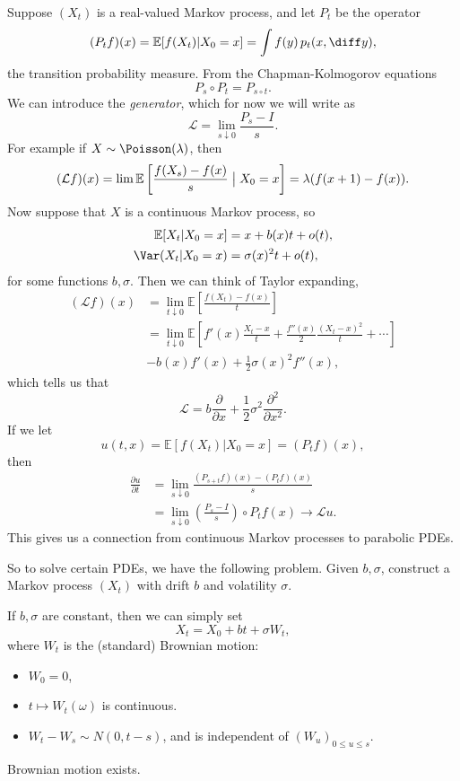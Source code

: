 \documentclass[12pt]{article}
\begin{document}
Suppose $(X_t)$ is a real-valued Markov process, and let $P_t$ be the operator
\[
	(P_t f)(x) = \mathbb{E}[f(X_t) | X_0 = x] = \int f(y) \, p_t(x, \diff y),
\]
the transition probability measure. From the Chapman-Kolmogorov equations
\[
P_s \circ P_t = P_{s \circ t}.
\]
We can introduce the \emph{generator}, which for now we will write as
\[
\mathcal{L} = \lim_{s \downarrow 0} \frac{P_s - I}{s}.
\]
For example if $X \sim \Poisson(\lambda)$, then
\[
	(\mathcal{L} f)(x) = \lim \mathbb{E}\left[ \frac{f(X_s) - f(x)}{s} \bigm| X_0 = x\right] = \lambda(f(x+1) - f(x)).
\]
Now suppose that $X$ is a continuous Markov process, so
\begin{align*}
	\mathbb{E}[X_t|X_0 = x] &= x + b(x) t + o(t), \\
	\Var(X_t|X_0 = x) &= \sigma(x)^2 t + o(t),
\end{align*}
for some functions $b, \sigma$. Then we can think of Taylor expanding,
\begin{align*}
	(\mathcal{L} f)(x) &= \lim_{t \downarrow 0} \mathbb{E}\left[ \frac{f(X_t) - f(x)}{t} \right] \\
			   &= \lim_{t \downarrow 0} \mathbb{E}\left[ f'(x) \frac{X_t - x}{t} + \frac{f''(x)}{2} \frac{(X_t - x)^2}{t} + \cdots \right] \\
			   &- b(x) f'(x) + \frac 12 \sigma(x)^2 f''(x),
\end{align*}
which tells us that
\[
\mathcal{L} = b \frac{\partial}{\partial x} + \frac 12 \sigma^2 \frac{\partial^2}{\partial x^2}.
\]
If we let
\[
u(t, x) = \mathbb{E}\left[ f(X_t) | X_0 = x \right] = (P_tf)(x),
\]
then
\begin{align*}
	\frac{\partial u}{\partial t} &= \lim_{s \downarrow 0} \frac{(P_{s+t}f)(x) - (P_tf)(x)}{s} \\
				      &= \lim_{s \downarrow 0} \left( \frac{P_s - I}{s} \right) \circ P_t f(x) \to \mathcal{L}u.
\end{align*}
This gives us a connection from continuous Markov processes to parabolic PDEs.

So to solve certain PDEs, we have the following problem. Given $b, \sigma$, construct a Markov process $(X_t)$ with drift $b$ and volatility $\sigma$.

If $b, \sigma$ are constant, then we can simply set
\[
X_t = X_0 + bt + \sigma W_t,
\]
where $W_t$ is the (standard) Brownian motion:
\begin{itemize}
	\item $W_0 = 0$,
	\item $t \mapsto W_t(\omega)$ is continuous.
	\item $W_t - W_s \sim N(0, t - s)$, and is independent of $(W_u)_{0 \leq u \leq s}$.
\end{itemize}
\begin{theorem}[Wiener]
	Brownian motion exists.
\end{theorem}
\end{document}
